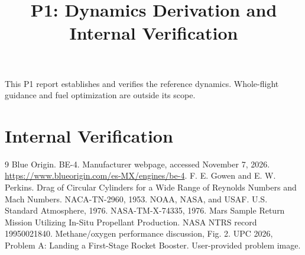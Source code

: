 \documentclass[12pt,a4paper]{article}
\title{P1: Dynamics Derivation and Internal Verification}
\author{}
\date{}
\begin{document}
\noindent This P1 report establishes and verifies the reference dynamics. Whole-flight guidance and fuel optimization are outside its scope.
\setcounter{section}{3}

\clearpage
\section{Internal Verification}

\clearpage
\begin{thebibliography}{9}
 Blue Origin. BE-4. Manufacturer webpage, accessed November 7, 2026. \url{https://www.blueorigin.com/es-MX/engines/be-4}.
 F. E. Gowen and E. W. Perkins. Drag of Circular Cylinders for a Wide Range of Reynolds Numbers and Mach Numbers. NACA-TN-2960, 1953.
 NOAA, NASA, and USAF. U.S. Standard Atmosphere, 1976. NASA-TM-X-74335, 1976.
 Mars Sample Return Mission Utilizing In-Situ Propellant Production. NASA NTRS record 19950021840. Methane/oxygen performance discussion, Fig. 2.
 UPC 2026, Problem A: Landing a First-Stage Rocket Booster. User-provided problem image.
\end{thebibliography}
\end{document}
